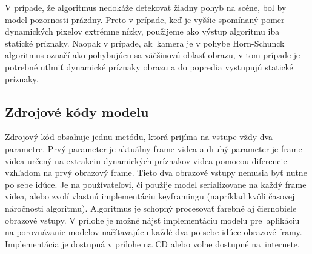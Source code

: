 V prípade, že algoritmus nedokáže detekovať žiadny pohyb na scéne, bol by model pozornosti prázdny.
Preto v prípade, keď je vyššie spomínaný pomer dynamických pixelov extrémne nízky, použijeme ako výstup algoritmu iba statické príznaky.
Naopak v prípade, ak~kamera je v pohybe Horn-Schunck algoritmus označí ako pohybujúcu sa väčšinovú oblasť obrazu, v tom prípade je potrebné utlmiť dynamické príznaky obrazu a do popredia vystupujú statické príznaky.

\clearpage

\subsection{Zdrojové kódy modelu}
Zdrojový kód obsahuje jednu metódu, ktorá prijíma na vstupe vždy dva parametre.
Prvý parameter je aktuálny frame videa a druhý parameter je frame videa určený na extrakciu dynamických príznakov videa pomocou diferencie vzhľadom na prvý obrazový frame.
Tieto dva obrazové vstupy nemusia byť nutne po sebe idúce.
Je na používateľovi, či použije model serializovane na každý frame videa, alebo zvolí vlastnú implementáciu keyframingu (napríklad kvôli časovej náročnosti algoritmu).
Algoritmus je schopný procesovať farebné aj čiernobiele obrazové vstupy.
V prílohe je možné nájsť implementáciu modelu pre~aplikáciu na porovnávanie modelov načítavajúcu každé dva po sebe idúce obrazové framy.
Implementácia je dostupná v prílohe na CD alebo voľne dostupné na~internete.

